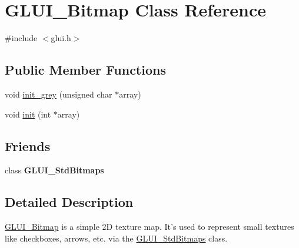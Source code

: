 \hypertarget{classGLUI__Bitmap}{\section{G\-L\-U\-I\-\_\-\-Bitmap Class Reference}
\label{classGLUI__Bitmap}
}


{\ttfamily \#include $<$glui.\-h$>$}

\subsection*{Public Member Functions}
\begin{DoxyCompactItemize}
\item 
void \hyperlink{classGLUI__Bitmap_a329b8c9e64d0a5df4d1cc657ed379075}{init\-\_\-grey} (unsigned char $\ast$array)
\item 
void \hyperlink{classGLUI__Bitmap_aac85d978c45e38395bbf504ad8abd9a9}{init} (int $\ast$array)
\end{DoxyCompactItemize}
\subsection*{Friends}
\begin{DoxyCompactItemize}
\item 
\hypertarget{classGLUI__Bitmap_aa9d1e2d4b5b5b9d0c2512496f768ecf4}{class {\bfseries G\-L\-U\-I\-\_\-\-Std\-Bitmaps}}\label{classGLUI__Bitmap_aa9d1e2d4b5b5b9d0c2512496f768ecf4}

\end{DoxyCompactItemize}


\subsection{Detailed Description}
\hyperlink{classGLUI__Bitmap}{G\-L\-U\-I\-\_\-\-Bitmap} is a simple 2\-D texture map. It's used to represent small textures like checkboxes, arrows, etc. via the \hyperlink{classGLUI__StdBitmaps}{G\-L\-U\-I\-\_\-\-Std\-Bitmaps} class. 

